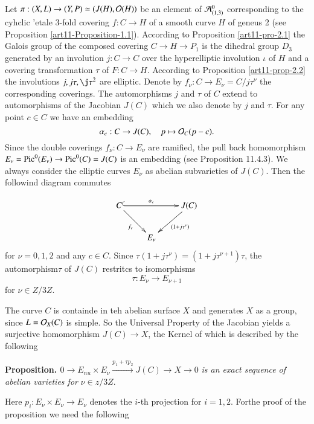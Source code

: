Let $\pi : (X, L) \rightarrow (Y, P) \simeq (J(H), \mathcal{O}(H))$ be an element of $\mathcal{A}_{(1,3)}^{0}$ corresponding to the cyhclic 'etale 3-fold covering $f : C\rightarrow H$ of a smooth curve $H$ of geneus 2
(see Proposition \ref{art11-Proposition-1.1}). According  to Proposition \ref{art11-pro-2.1} the Galois group of the composed covering $C\rightarrow H \rightarrow P_{1}$ is the dihedral group $D_{3}$ generated by an involution $j : C\rightarrow C$ over the hyperelliptic involution $\iota$ of $H$ and a covering transformation $\tau$ of $F :C \rightarrow H$. According to Proposition \ref{art11-prop-2.2} the involutions $j, j\tau, \j\tau^{2}$ are elliptic. Denote by $f_{\nu} : C\rightarrow E_{\nu} = C/j\tau^{\nu}$ the corresponding coverings. The automorphisms $j$ and $\tau$ of $C$ extend to automorphisms of the Jacobian $J(C)$ which we also denote by $j$ and $\tau$. For any point $c \in C$ we have an embedding
$$
\alpha_{c}: C\rightarrow J(C),\quad p \mapsto \mathcal{O}_{C}(p-c).
$$
Since the double coverings $f_{\nu}: C \rightarrow E_{\nu}$ are ramified, the pull back homomorphism $E_{\nu} = \operatorname{Pic}^{0}(E_{\nu}) \rightarrow \operatorname{Pic}^{0}(C)=J(C)$ is an embedding (see \cite{art11-keyL-B} Proposition 11.4.3). We always
consider the elliptic curves $E_{\nu}$ as abelian subvarieties of $J(C)$. Then the followind diagram commutes

\setcounter{equation}{0}
\begin{equation}\label{art11-sec-eq-1}
\vcenter{
\xymatrix{
C  \ar@{^{(}->}[rr]^-{\alpha_{c}}\ar[dr]_{f_{\nu}} &  &J(C)\ar[dl]^-{(1+j\tau^{\nu})} \\
   & E_{\nu}  &
}}
\end{equation}
for $\nu =0,1,2$ and any $c \in C$. Since $\tau(1+j\tau^{\nu})=(1 + j\tau^{\nu+1})\tau$, the automorphism$\tau$ of $J(C)$ restritcs to isomorphisms
$$
\tau : E_{\nu} \rightarrow E_{\nu+1}
$$
for $\nu \in Z /3Z$.

 The curve $C$ is containde in teh abelian surface $X$ and generates $X$ as a group, since $L =\mathcal{O}_{X}(C)$ is simple. So the Universal Property of the Jacobian yields a surjective homomorphism $J(C)\rightarrow X$, the Kernel of which is described by the following

\medskip
\noindent
{\bfseries {} Proposition. \label{art11-prop-5.1}}
$0\rightarrow  E_{nu} \times E_{\nu} \xrightarrow {p_{1}+\tau p_{2}}J(C) \rightarrow X \rightarrow 0$ \textit{is an exact sequence of abelian varieties for} $\nu \in z /3Z$. 

 Here $p_{i}: E_{\nu} \times E_{\nu} \rightarrow E_{\nu}$ denotes the $i$-th projection for $i=1,2$. Forthe proof of the proposition we need the following

